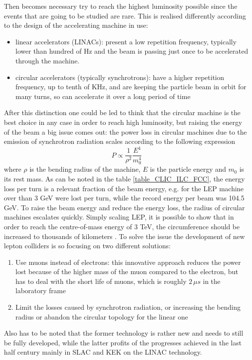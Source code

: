 Then becomes necessary try to reach the highest luminosity possible since the events that are going to be studied are rare. This is realised differently according to the design of the accelerating machine in use:
\begin{itemize}
\item linear accelerators (LINACs): present a low repetition frequency, typically lower than hundred of Hz and the beam is passing just once to be accelerated through the machine.
\item circular accelerators (typically synchrotrons): have a higher repetition frequency, up to tenth of KHz, and are keeping the particle beam in orbit for many turns, so can accelerate it over a long period of time
\end{itemize}
After this distinction one could be led to think that the circular machine is the best choice in any case in order to reach high luminosity, but raising the energy of the beam a big issue comes out: the power loss in circular machines due to the emission of synchrotron radiation scales according to the following expression
\begin{equation}
P \propto \frac{1}{\rho^2} \frac{E^4}{m_0^4}
\end{equation}
where $\rho$ is the bending radius of the machine, $E$ is the particle energy and $m_0$ is its rest mass. As can be noted in the table \ref{table_CLIC_ILC_FCC}, the energy loss per turn is a relevant fraction of the beam energy, e.g. for the LEP machine over than 3 GeV were lost per turn, while the record energy per beam was 104.5 GeV. To raise the beam energy and reduce the energy loss, the radius of circular machines escalates quickly. Simply scaling LEP, it is possible to show that in order to reach the centre-of-mass energy of 3 TeV, the circumference should be increased to thousands of kilometers \cite{nature:CLIC}.
To solve the issue the development of new lepton colliders is so focusing on two different solutions:
\begin{enumerate}
\item Use muons instead of electrons: this innovative approach reduces the power lost because of the higher mass of the muon compared to the electron, but has to deal with the short life of muons, which is roughly $2 \, \mu s$ in the laboratory frame
\item Limit the losses caused by synchrotron radiation, or increasing the bending radius or abandon the circular topology for the linear one
\end{enumerate}
Also has to be noted that the former technology is rather new and needs to still be fully developed, while the latter profits of the progresses achieved in the last half century mainly in SLAC and KEK on the LINAC technology.

